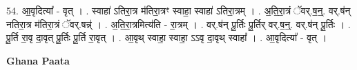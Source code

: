 \documentclass[17pt]{extarticle}
\begin{document}
54. आ॒वृदित्या᳚ - वृत् । . स्वाहा॑ ऽतिरा॒त्र म॑तिरा॒त्रꣳ स्वाहा॒ स्वाहा॑ ऽतिरा॒त्रम् । . अ॒ति॒रा॒त्रं ॅवर्.ष॒न्॒. वर्.ष॑न् नतिरा॒त्र म॑तिरा॒त्रं ॅवर्.षन्न्॑ । . अ॒ति॒रा॒त्रमित्य॑ति - रा॒त्रम् । . वर्.ष॑न् पू॒र्तिः पू॒र्तिर् वर्.ष॒न्॒. वर्.ष॑न् पू॒र्तिः । . पू॒र्ति रा॒वृ दा॒वृत् पू॒र्तिः पू॒र्ति रा॒वृत् । . आ॒वृथ् स्वाहा॒ स्वाहा॒ ऽऽवृ दा॒वृथ् स्वाहा᳚ । . आ॒वृदित्या᳚ - वृत् । \newline

\textbf{Ghana Paata } \newline
\end{document}
